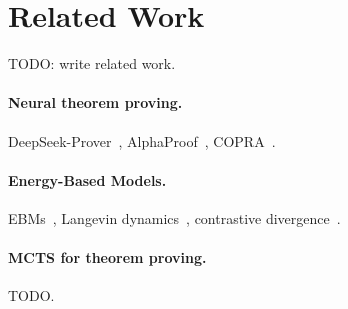 
\section{Related Work}
\label{sec:related}

TODO: write related work.

\paragraph{Neural theorem proving.}
DeepSeek-Prover~\cite{TODO}, AlphaProof~\cite{TODO}, COPRA~\cite{TODO}.

\paragraph{Energy-Based Models.}
EBMs~\cite{TODO}, Langevin dynamics~\cite{TODO}, contrastive divergence~\cite{TODO}.

\paragraph{MCTS for theorem proving.}
TODO.
